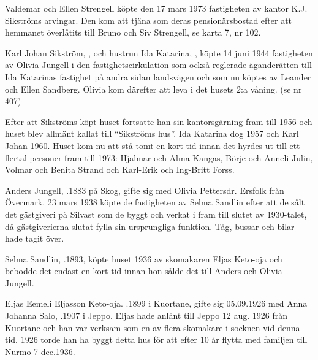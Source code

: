 {{{{%
%
Valdemar och Ellen Strengell köpte den 17 mars 1973 fastigheten av kantor K.J. Sikströms arvingar. Den kom att tjäna som deras pensionärsbostad efter att hemmanet överlåtits till Bruno och Siv Strengell, se karta 7, nr 102.


%
Karl Johan Sikström, , och hustrun Ida Katarina, , köpte 14 juni 1944 fastigheten av Olivia Jungell i den fastighetscirkulation som också reglerade äganderätten till Ida Katarinas fastighet på andra sidan landsvägen och som nu köptes av Leander och Ellen Sandberg. Olivia kom därefter att leva i det husets 2:a våning. (se nr 407)

Efter att Sikströms köpt huset fortsatte han sin kantorsgärning fram till 1956 och huset blev allmänt kallat till ``Sikströms hus''. Ida Katarina dog 1957 och Karl Johan 1960. Huset kom nu att stå tomt en kort tid innan det hyrdes ut till ett flertal personer fram till 1973:
Hjalmar och Alma Kangas, Börje och Anneli Julin, Volmar och Benita Strand och Karl-Erik och Ing-Britt Forss.


%
Anders Jungell, .1883 på Skog, gifte sig med Olivia Pettersdr. Ersfolk från Övermark. 23 mars 1938 köpte de fastigheten av Selma Sandlin efter att de sålt det gästgiveri på Silvast som de byggt och verkat i fram till slutet av 1930-talet, då gästgiverierna slutat fylla sin ursprungliga funktion. Tåg, bussar och bilar hade tagit över.


%
Selma Sandlin, .1893, köpte huset 1936 av skomakaren Eljas Keto-oja och bebodde det endast en kort tid innan hon sålde det till Anders och Olivia Jungell.


%
Eljas Eemeli Eljasson Keto-oja. .1899 i Kuortane, gifte sig 05.09.1926 med Anna Johanna Salo, .1907 i Jeppo. Eljas hade anlänt till Jeppo 12 aug. 1926 från Kuortane och han var verksam som en av flera skomakare i socknen vid denna tid. 1926 torde han ha byggt detta hus för att efter 10 år flytta med familjen till Nurmo 7 dec.1936.
\begin{jhchildren}
  \item {}
  \item {}
\end{jhchildren}



}}}}
